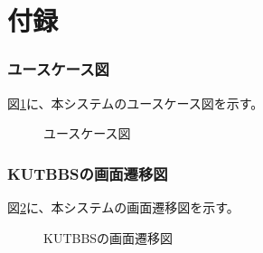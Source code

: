 \documentclass[a4j]{jarticle}
\begin{document}
% 
%
%
%
\newpage
\appendix
\part*{付録}

\setcounter{section}{0} %
\renewcommand{\thesection}{\Alph{section}} %
\setcounter{figure}{0} %
\renewcommand{\thefigure}{\Alph{section}}


\section{ユースケース図}
図\ref{UseCase:UseCasetest}に、本システムのユースケース図を示す。
\begin{figure}[H]
\begin{center}
\caption{ユースケース図}
\label{UseCase:UseCasetest}
\end{center}
\end{figure}

\newpage
\section{KUTBBSの画面遷移図}
図\ref{fig:Screen_transition}に、本システムの画面遷移図を示す。
\begin{figure}[H]
\centering
{}
\caption{KUTBBSの画面遷移図}
\label{fig:Screen_transition}
\end{figure}
\end{document}
